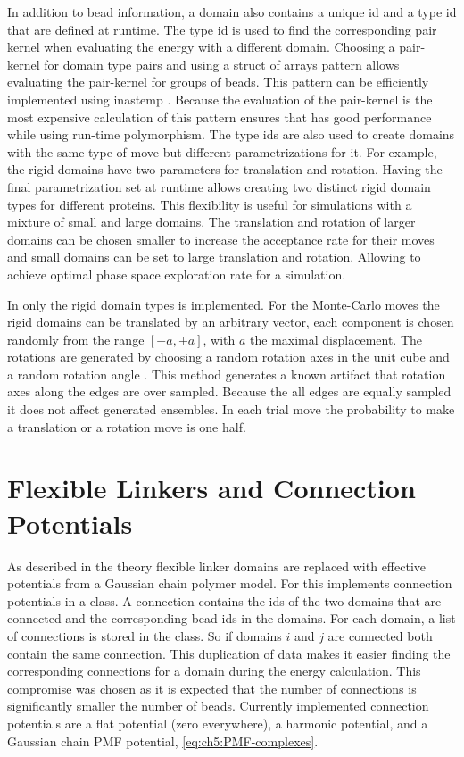 \documentclass[12pt, twoside]{report}
\begin{document}
In addition to bead information, a domain also contains a unique id and a type
id that are defined at runtime. The type id is used to find the corresponding
pair kernel when evaluating the energy with a different domain. Choosing a
pair-kernel for domain type pairs and using a struct of arrays pattern allows
evaluating the pair-kernel for groups of beads. This pattern can be efficiently
implemented using inastemp \cite{Bramas2017}. Because the evaluation of the
pair-kernel is the most expensive calculation of \complexes this pattern ensures
that \complexes has good performance while using run-time polymorphism. The type
ids are also used to create domains with the same type of move but different
parametrizations for it. For example, the rigid domains have two parameters for
translation and rotation. Having the final parametrization set at runtime allows
creating two distinct rigid domain types for different proteins. This
flexibility is useful for simulations with a mixture of small and large domains.
The translation and rotation of larger domains can be chosen smaller to increase
the acceptance rate for their moves and small domains can be set to large
translation and rotation. Allowing to achieve optimal phase space exploration
rate for a simulation.

In \complexes only the rigid domain types is implemented. For the Monte-Carlo
moves the rigid domains can be translated by an arbitrary vector, each component
is chosen randomly from the range \([-a, +a]\), with \(a\) the maximal
displacement. The rotations are generated by choosing a random rotation axes in
the unit cube and a random rotation angle \cite{frenkel2001understanding}. This
method generates a known artifact that rotation axes along the edges are over
sampled. Because the all edges are equally sampled it does not affect generated
ensembles. In each trial move the probability to make a translation or a
rotation move is one half.

\section{Flexible Linkers and Connection Potentials}
As described in the theory flexible linker domains are replaced with effective
potentials from a Gaussian chain polymer model. For this \complexes implements
connection potentials in a  class. A connection contains
the ids of the two domains that are connected and the corresponding bead ids in
the domains. For each domain, a list of connections is stored in the class. So
if domains \(i\) and \(j\) are connected both contain the same connection. This
duplication of data makes it easier finding the corresponding connections for a
domain during the energy calculation. This compromise was chosen as it is
expected that the number of connections is significantly smaller the number of
beads. Currently implemented connection potentials are a flat potential (zero
everywhere), a harmonic potential, and a Gaussian chain \gls{PMF} potential,
\cref{eq:ch5:PMF-complexes}.
\end{document}
